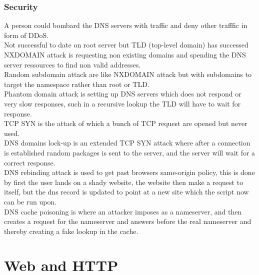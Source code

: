 \documentclass[12pt, a4paper]{article}
\begin{document}
			\subsubsection{Security}
				A person could bombard the DNS servers with traffic and deny other trafffic in form of DDoS.\\
				Not successful to date on root server but TLD (top-level domain) has successed\\
				NXDOMAIN attack is requesting non existing domains and spending the DNS server ressources to find non valid addresses.\\
				Random subdomain attack are like NXDOMAIN attack but with subdomains to target the namespace rather than root or TLD.\\
				Phantom domain attack is setting up DNS servers which does not respond or very slow responses, such in a recursive lookup the TLD will have to wait for response.\\
				TCP SYN is the attack of which a bunch of TCP request are opened but never used.\\
				DNS domains lock-up is an extended TCP SYN attack where after a connection is established random packages is sent to the server, and the server will wait for a correct response.\\
				DNS rebinding attack is used to get past browsers same-origin policy, this is done by first the user lands on a shady website, the website then make a request to itself, but the dns record is updated to point at a new site which the script now can be run upon.\\
				DNS cache poisoning is where an attacker imposes as a nameserver, and then creates a request for the nameserver and answers before the real nameserver and thereby creating a fake lookup in the cache.
	\section{Web and HTTP}
\end{document}
